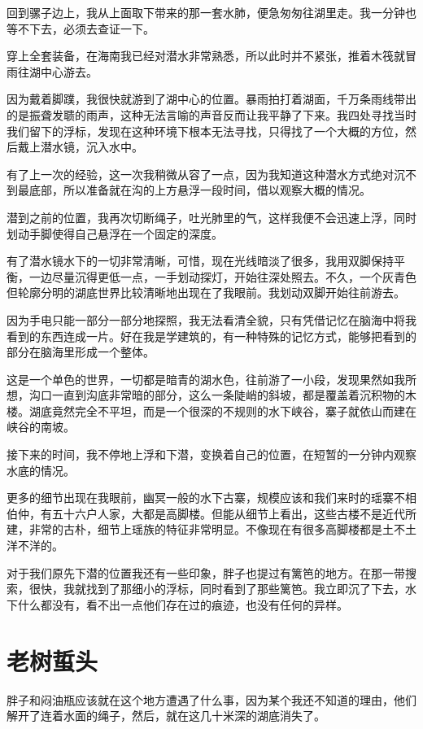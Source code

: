 回到骡子边上，我从上面取下带来的那一套水肺，便急匆匆往湖里走。我一分钟也等不下去，必须去查证一下。

穿上全套装备，在海南我已经对潜水非常熟悉，所以此时并不紧张，推着木筏就冒雨往湖中心游去。

因为戴着脚蹼，我很快就游到了湖中心的位置。暴雨拍打着湖面，千万条雨线带出的是振聋发聩的雨声，这种无法言喻的声音反而让我平静了下来。我四处寻找当时我们留下的浮标，发现在这种环境下根本无法寻找，只得找了一个大概的方位，然后戴上潜水镜，沉入水中。

有了上一次的经验，这一次我稍微从容了一点，因为我知道这种潜水方式绝对沉不到最底部，所以准备就在沟的上方悬浮一段时间，借以观察大概的情况。

潜到之前的位置，我再次切断绳子，吐光肺里的气，这样我便不会迅速上浮，同时划动手脚使得自己悬浮在一个固定的深度。

有了潜水镜水下的一切非常清晰，可惜，现在光线暗淡了很多，我用双脚保持平衡，一边尽量沉得更低一点，一手划动探灯，开始往深处照去。不久，一个灰青色但轮廓分明的湖底世界比较清晰地出现在了我眼前。我划动双脚开始往前游去。

因为手电只能一部分一部分地探照，我无法看清全貌，只有凭借记忆在脑海中将我看到的东西连成一片。好在我是学建筑的，有一种特殊的记忆方式，能够把看到的部分在脑海里形成一个整体。

这是一个单色的世界，一切都是暗青的湖水色，往前游了一小段，发现果然如我所想，沟口一直到沟底非常暗的部分，这么一条陡峭的斜坡，都是覆盖着沉积物的木楼。湖底竟然完全不平坦，而是一个很深的不规则的水下峡谷，寨子就依山而建在峡谷的南坡。

接下来的时间，我不停地上浮和下潜，变换着自己的位置，在短暂的一分钟内观察水底的情况。

更多的细节出现在我眼前，幽冥一般的水下古寨，规模应该和我们来时的瑶寨不相伯仲，有五十六户人家，大都是高脚楼。但能从细节上看出，这些古楼不是近代所建，非常的古朴，细节上瑶族的特征非常明显。不像现在有很多高脚楼都是土不土洋不洋的。

对于我们原先下潜的位置我还有一些印象，胖子也提过有篱笆的地方。在那一带搜索，很快，我就找到了那细小的浮标，同时看到了那些篱笆。我立即沉了下去，水下什么都没有，看不出一点他们存在过的痕迹，也没有任何的异样。

\chapter{老树蜇头}

胖子和闷油瓶应该就在这个地方遭遇了什么事，因为某个我还不知道的理由，他们解开了连着水面的绳子，然后，就在这几十米深的湖底消失了。

